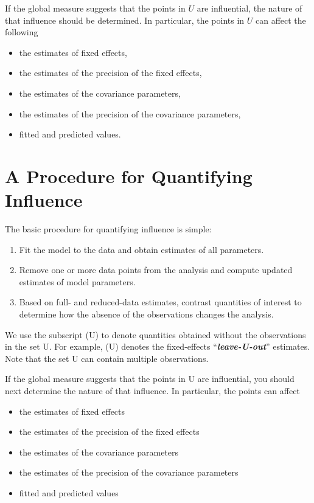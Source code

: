 \documentclass[Main.tex]{subfiles}
\begin{document}
		If the global measure suggests that the points in $U$ are influential, the nature of that influence should be determined. In particular, the points in $U$ can affect the following
		
		\begin{itemize}
			\item the estimates of fixed effects,
			\item the estimates of the precision of the fixed effects,
			\item the estimates of the covariance parameters,
			\item the estimates of the precision of the covariance parameters,
			\item fitted and predicted values.
		\end{itemize}
	

		

		
			
			
			
\newpage		
			\section{A Procedure for Quantifying Influence}  %

		
		The basic procedure for quantifying influence is simple:
		
		\begin{enumerate}
			\item Fit the model to the data and obtain estimates of all parameters.
			\item Remove one or more data points from the analysis and compute updated estimates of model parameters.
			\item Based on full- and reduced-data estimates, contrast quantities of interest to determine how the absence
			of the observations changes the analysis.
		\end{enumerate}
		We use the subscript (U) to denote quantities obtained without the observations in the set U. For example,
		(U) denotes the fixed-effects “\textit{\textbf{leave-U-out}}” estimates. Note that the set U can contain multiple observations.
		
		
		If the global measure suggests that the points in U are influential, you should next determine the nature of
		that influence. In particular, the points can affect
		\begin{itemize}
			\item the estimates of fixed effects
			\item the estimates of the precision of the fixed effects
			\item the estimates of the covariance parameters
			\item the estimates of the precision of the covariance parameters
			\item fitted and predicted values
		\end{itemize}
		
\end{document}
